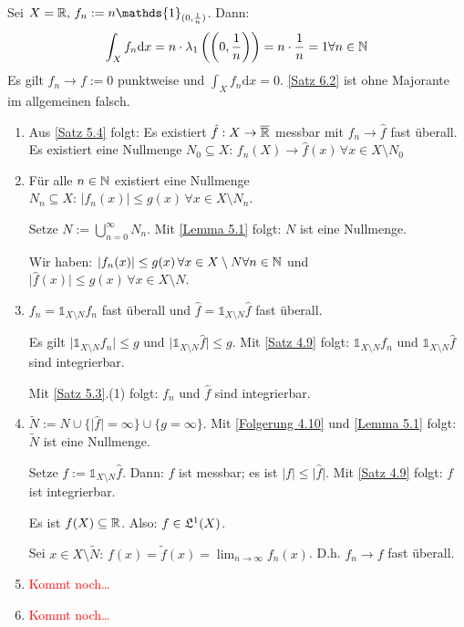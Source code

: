 \documentclass[a4paper,twoside,DIV15,BCOR12mm,chapterprefix=true,headings=onelinechapter]{scrbook}
\begin{document}
\begin{beispiel}
Sei \(X=\mdr,\,f_{n}:=n\mathds{1}_{(0,\frac{1}{n})}\). Dann:
\[
\int_{X}{f_{n}\mathrm{d}x}=n\cdot\lambda_{1}\left(\left(0,\frac{1}{n}\right)\right)=n\cdot\frac{1}{n}=1\forall n\in\mathbb{N}
\]
Es gilt \(f_{n}\to f:=0\) punktweise und \(\int_{X}{f_{n}\mathrm{d}x}=0\). \ref{Satz 6.2} ist ohne Majorante im allgemeinen
falsch.
\end{beispiel}

\begin{beweis}
\begin{enumerate}
\item Aus \ref{Satz 5.4} folgt: Es existiert \(\hat{f}:X\to\overline{\mathbb{R}}\) messbar mit \(f_{n}\to\hat{f}\) fast \"uberall.
Es existiert eine Nullmenge \(N_{0}\subseteq X:\,f_{n}(X)\to\hat{f}(x)\,\forall x\in X\setminus N_{0}\)
\item F\"ur alle \(n\in\mathbb{N}\) existiert eine Nullmenge \(N_{n}\subseteq X:\,\lvert f_{n}(x)\rvert\leq g(x)\,\forall x\in X\setminus N_{n}\).

Setze \(N:=\bigcup_{n=0}^{\infty}{N_{n}}\). Mit \ref{Lemma 5.1} folgt: \(N\) ist eine Nullmenge.

Wir haben: \(\lvert f_{n}(x)\rvert\leq g(x)\,\forall x\in X\setminus N\forall n\in\mathbb{N}\) und
\(\lvert\hat{f}(x)\rvert\leq g(x)\,\forall x\in X\setminus N\).
\item \(f_{n}=\mathds{1}_{X\setminus N}f_{n}\) fast \"uberall und \(\hat{f}=\mathds{1}_{X\setminus N}\hat{f}\)
fast \"uberall.

Es gilt \(\lvert\mathds{1}_{X\setminus N}f_{n}\rvert\leq g\) und \(\lvert\mathds{1}_{X\setminus N}\hat{f}\rvert\leq g\). Mit
\ref{Satz 4.9} folgt: \(\mathds{1}_{X\setminus N}f_{n}\) und \(\mathds{1}_{X\setminus N}\hat{f}\) sind integrierbar.

Mit \ref{Satz 5.3}.(1) folgt: \(f_{n}\) und \(\hat{f}\) sind integrierbar.
\item \(\tilde{N}:=N\cup\{\lvert\hat{f}\rvert=\infty\}\cup\{g=\infty\}\). Mit \ref{Folgerung 4.10} und \ref{Lemma 5.1} folgt:
\(\tilde{N}\) ist eine Nullmenge.

Setze \(f:=\mathds{1}_{X\setminus N}\hat{f}\). Dann: \(f\) ist messbar; es ist \(\lvert f\rvert\leq\lvert\hat{f}\rvert\).
Mit \ref{Satz 4.9} folgt: \(f\) ist integrierbar.

Es ist \(f(X)\subseteq\mathbb{R}\). Also: \(f\in\mathfrak{L}^{1}(X)\).

Sei \(x\in X\setminus\tilde{N}:\,f(x)=\tilde{f}(x)=\lim_{n\to\infty}f_{n}(x)\).
D.h. \(f_{n}\to f\) fast \"uberall.
\item \textcolor{red}{Kommt noch\ldots}
\item \textcolor{red}{Kommt noch\ldots}
\end{enumerate}
\end{beweis}
\end{document}
